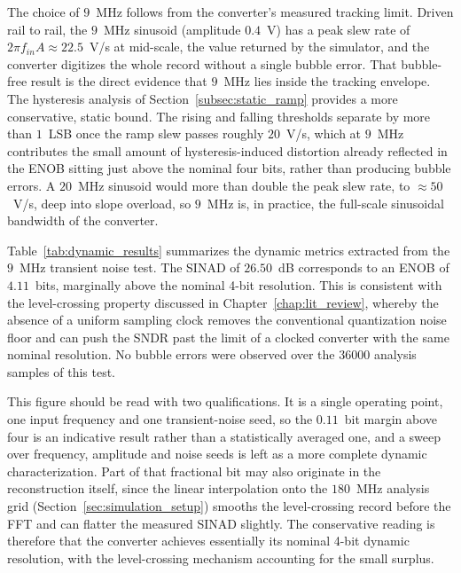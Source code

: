 The choice of $9$~MHz follows from the converter's measured tracking limit. Driven rail to rail, the $9$~MHz sinusoid (amplitude $0.4$~V) has a peak slew rate of $2\pi f_{in} A \approx 22.5$~V/\textmu s at mid-scale, the value returned by the simulator, and the converter digitizes the whole record without a single bubble error. That bubble-free result is the direct evidence that $9$~MHz lies inside the tracking envelope. The hysteresis analysis of Section~\ref{subsec:static_ramp} provides a more conservative, static bound. The rising and falling thresholds separate by more than $1$~LSB once the ramp slew passes roughly $20$~V/\textmu s, which at $9$~MHz contributes the small amount of hysteresis-induced distortion already reflected in the ENOB sitting just above the nominal four bits, rather than producing bubble errors. A $20$~MHz sinusoid would more than double the peak slew rate, to $\approx 50$~V/\textmu s, deep into slope overload, so $9$~MHz is, in practice, the full-scale sinusoidal bandwidth of the converter.

Table~\ref{tab:dynamic_results} summarizes the dynamic metrics extracted from the $9$~MHz transient noise test. The SINAD of $26.50$~dB corresponds to an ENOB of $4.11$~bits, marginally above the nominal 4-bit resolution. This is consistent with the level-crossing property discussed in Chapter~\ref{chap:lit_review}, whereby the absence of a uniform sampling clock removes the conventional quantization noise floor and can push the SNDR past the limit of a clocked converter with the same nominal resolution. No bubble errors were observed over the $36000$ analysis samples of this test.

This figure should be read with two qualifications. It is a single operating point, one input frequency and one transient-noise seed, so the $0.11$~bit margin above four is an indicative result rather than a statistically averaged one, and a sweep over frequency, amplitude and noise seeds is left as a more complete dynamic characterization. Part of that fractional bit may also originate in the reconstruction itself, since the linear interpolation onto the $180$~MHz analysis grid (Section~\ref{sec:simulation_setup}) smooths the level-crossing record before the FFT and can flatter the measured SINAD slightly. The conservative reading is therefore that the converter achieves essentially its nominal 4-bit dynamic resolution, with the level-crossing mechanism accounting for the small surplus.

